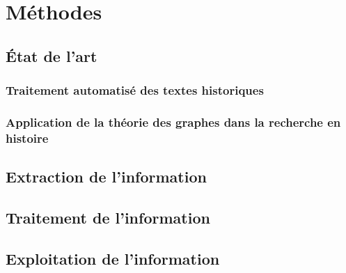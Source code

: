 \chapter{Méthodes}
\section{État de l'art}
\subsection{Traitement automatisé des textes historiques}
\subsection{Application de la théorie des graphes dans la recherche en histoire}
\section{Extraction de l'information}
\section{Traitement de l'information}
\section{Exploitation de l'information}




